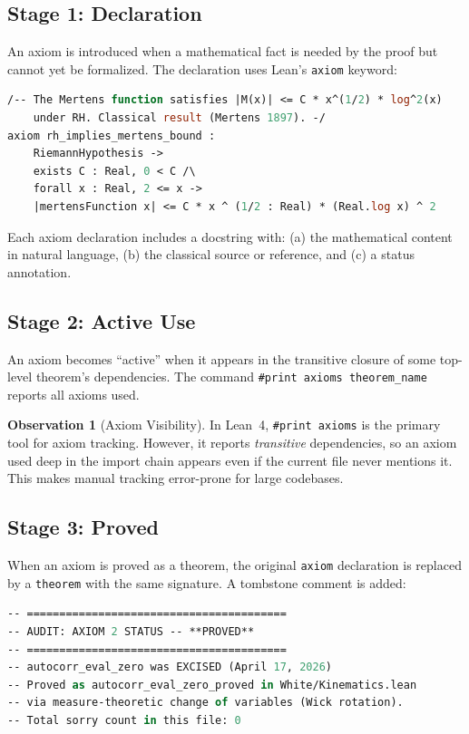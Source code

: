 \documentclass[11pt,a4paper]{article}
\theoremstyle{definition}
\newtheorem{observation}[definition]{Observation}
\newcommand{\lean}[1]{\texttt{#1}}
\begin{document}
\subsection{Stage 1: Declaration}

An axiom is introduced when a mathematical fact is needed by the
proof but cannot yet be formalized. The declaration uses Lean's
\lean{axiom} keyword:

\begin{lstlisting}[language=ML,caption={Axiom declaration example}]
/-- The Mertens function satisfies |M(x)| <= C * x^(1/2) * log^2(x)
    under RH. Classical result (Mertens 1897). -/
axiom rh_implies_mertens_bound :
    RiemannHypothesis ->
    exists C : Real, 0 < C /\
    forall x : Real, 2 <= x ->
    |mertensFunction x| <= C * x ^ (1/2 : Real) * (Real.log x) ^ 2
\end{lstlisting}

Each axiom declaration includes a docstring with:
(a) the mathematical content in natural language,
(b) the classical source or reference, and
(c) a status annotation.

\subsection{Stage 2: Active Use}

An axiom becomes ``active'' when it appears in the transitive closure
of some top-level theorem's dependencies. The command
\lean{\#print axioms theorem\_name} reports all axioms used.

\begin{observation}[Axiom Visibility]
In Lean~4, \lean{\#print axioms} is the primary tool for axiom
tracking. However, it reports \emph{transitive} dependencies, so an
axiom used deep in the import chain appears even if the current file
never mentions it. This makes manual tracking error-prone for large
codebases.
\end{observation}

\subsection{Stage 3: Proved}

When an axiom is proved as a theorem, the original \lean{axiom}
declaration is replaced by a \lean{theorem} with the same signature.
A tombstone comment is added:

\begin{lstlisting}[language=ML,caption={Axiom elimination pattern}]
-- ========================================
-- AUDIT: AXIOM 2 STATUS -- **PROVED**
-- ========================================
-- autocorr_eval_zero was EXCISED (April 17, 2026)
-- Proved as autocorr_eval_zero_proved in White/Kinematics.lean
-- via measure-theoretic change of variables (Wick rotation).
-- Total sorry count in this file: 0
\end{lstlisting}
\end{document}
